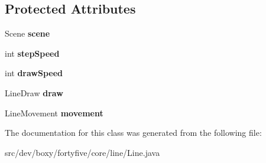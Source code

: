\subsection*{Protected Attributes}
\begin{DoxyCompactItemize}
\item 
\hypertarget{classdev_1_1boxy_1_1fortyfive_1_1core_1_1line_1_1_line_a2dc3926e959dd05cc8ee8c11ffeb231f}{
Scene {\bfseries scene}}
\label{d1/de6/classdev_1_1boxy_1_1fortyfive_1_1core_1_1line_1_1_line_a2dc3926e959dd05cc8ee8c11ffeb231f}

\item 
\hypertarget{classdev_1_1boxy_1_1fortyfive_1_1core_1_1line_1_1_line_a3f01e1e1e53f982d90c962da195ebee0}{
int {\bfseries stepSpeed}}
\label{d1/de6/classdev_1_1boxy_1_1fortyfive_1_1core_1_1line_1_1_line_a3f01e1e1e53f982d90c962da195ebee0}

\item 
\hypertarget{classdev_1_1boxy_1_1fortyfive_1_1core_1_1line_1_1_line_a8a2c260f673a8dcca506508c1e49b646}{
int {\bfseries drawSpeed}}
\label{d1/de6/classdev_1_1boxy_1_1fortyfive_1_1core_1_1line_1_1_line_a8a2c260f673a8dcca506508c1e49b646}

\item 
\hypertarget{classdev_1_1boxy_1_1fortyfive_1_1core_1_1line_1_1_line_a2f3929c3508a2639d96b8e593216fa71}{
LineDraw {\bfseries draw}}
\label{d1/de6/classdev_1_1boxy_1_1fortyfive_1_1core_1_1line_1_1_line_a2f3929c3508a2639d96b8e593216fa71}

\item 
\hypertarget{classdev_1_1boxy_1_1fortyfive_1_1core_1_1line_1_1_line_ad15b0c1a54c59f96a35587fa03a16da4}{
LineMovement {\bfseries movement}}
\label{d1/de6/classdev_1_1boxy_1_1fortyfive_1_1core_1_1line_1_1_line_ad15b0c1a54c59f96a35587fa03a16da4}

\end{DoxyCompactItemize}


The documentation for this class was generated from the following file:\begin{DoxyCompactItemize}
\item 
src/dev/boxy/fortyfive/core/line/Line.java\end{DoxyCompactItemize}
